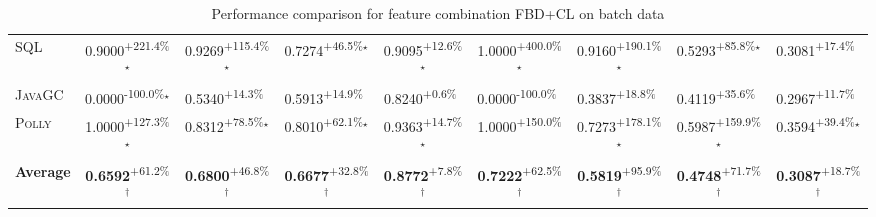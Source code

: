 \begin{table}[htbp]
\begin{tabular}{l|cccc|cccc}
\textsc{SQL} & \cellcolor{green!30}0.9000\textsuperscript{+221.4\%}$^\star$ & \cellcolor{green!30}0.9269\textsuperscript{+115.4\%}$^\star$ & \cellcolor{green!30}0.7274\textsuperscript{+46.5\%}$^\star$ & \cellcolor{green!30}0.9095\textsuperscript{+12.6\%}$^\star$ & \cellcolor{green!30}1.0000\textsuperscript{+400.0\%}$^\star$ & \cellcolor{green!30}0.9160\textsuperscript{+190.1\%}$^\star$ & \cellcolor{green!30}0.5293\textsuperscript{+85.8\%}$^\star$ & \cellcolor{green!30}0.3081\textsuperscript{+17.4\%}$^{\,\,\,}$ \\
\textsc{JavaGC} & \cellcolor{red!30}0.0000\textsuperscript{-100.0\%}$^\star$ & \cellcolor{green!30}0.5340\textsuperscript{+14.3\%}$^{\,\,\,}$ & \cellcolor{green!30}0.5913\textsuperscript{+14.9\%}$^{\,\,\,}$ & \cellcolor{green!30}0.8240\textsuperscript{+0.6\%}$^{\,\,\,}$ & \cellcolor{red!30}0.0000\textsuperscript{-100.0\%}$^{\,\,\,}$ & \cellcolor{green!30}0.3837\textsuperscript{+18.8\%}$^{\,\,\,}$ & \cellcolor{green!30}0.4119\textsuperscript{+35.6\%}$^{\,\,\,}$ & \cellcolor{green!30}0.2967\textsuperscript{+11.7\%}$^{\,\,\,}$ \\
\textsc{Polly} & \cellcolor{green!30}1.0000\textsuperscript{+127.3\%}$^\star$ & \cellcolor{green!30}0.8312\textsuperscript{+78.5\%}$^\star$ & \cellcolor{green!30}0.8010\textsuperscript{+62.1\%}$^\star$ & \cellcolor{green!30}0.9363\textsuperscript{+14.7\%}$^\star$ & \cellcolor{green!30}1.0000\textsuperscript{+150.0\%}$^{\,\,\,}$ & \cellcolor{green!30}0.7273\textsuperscript{+178.1\%}$^\star$ & \cellcolor{green!30}0.5987\textsuperscript{+159.9\%}$^\star$ & \cellcolor{green!30}0.3594\textsuperscript{+39.4\%}$^\star$ \\
\hline
\textbf{Average} & \cellcolor{green!30}\textbf{0.6592}\textsuperscript{+61.2\%}$^\dagger$ & \cellcolor{green!30}\textbf{0.6800}\textsuperscript{+46.8\%}$^\dagger$ & \cellcolor{green!30}\textbf{0.6677}\textsuperscript{+32.8\%}$^\dagger$ & \cellcolor{green!30}\textbf{0.8772}\textsuperscript{+7.8\%}$^\dagger$ & \cellcolor{green!30}\textbf{0.7222}\textsuperscript{+62.5\%}$^\dagger$ & \cellcolor{green!30}\textbf{0.5819}\textsuperscript{+95.9\%}$^\dagger$ & \cellcolor{green!30}\textbf{0.4748}\textsuperscript{+71.7\%}$^\dagger$ & \cellcolor{green!30}\textbf{0.3087}\textsuperscript{+18.7\%}$^\dagger$ \\
\hline
\end{tabular}
\caption{Performance comparison for feature combination FBD+CL on batch data}
\label{tab:combo_FBD_CL_performance_batch}
\end{table}